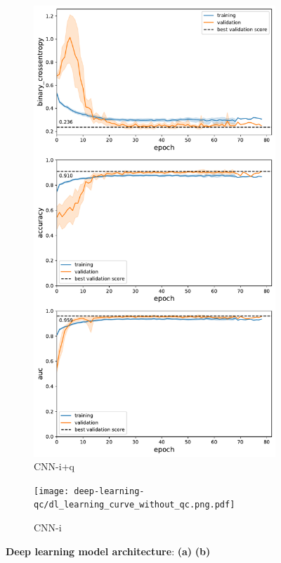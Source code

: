 \documentclass[fleqn,10pt]{wlscirep}
\begin{document}
\begin{figure}[tbp]
    \begin{subfigure}[t]{0.5\textwidth}
    \centering
    \includegraphics[width=\linewidth]{deep-learning-qc/dl_learning_curve_with_qc.pdf}
    \caption{CNN-i+q}
    \label{fig:dl-loss:both}
    \end{subfigure}
    \begin{subfigure}[t]{0.5\textwidth}
    \centering
    \texttt{[image: deep-learning-qc/dl\_learning\_curve\_without\_qc.png.pdf]}
    \caption{CNN-i}
    \label{fig:dl-loss:imaging}
    \end{subfigure}
    \caption{%
        {\bf Deep learning model architecture}:
        \textbf{(a)}
        \textbf{(b)}
    }
    \label{fig:dl-architecture}
\end{figure}
\end{document}
